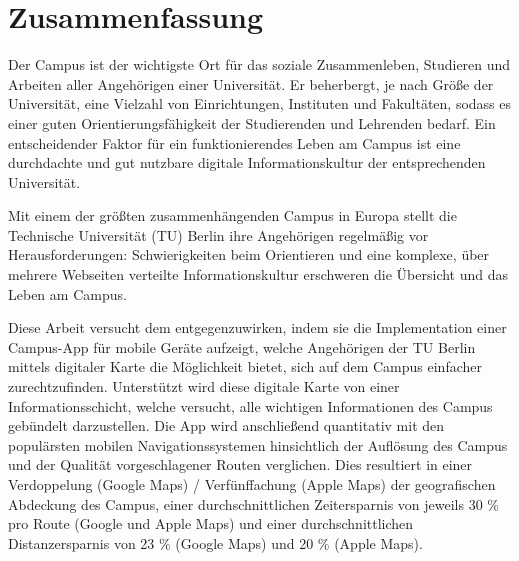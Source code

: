 \chapter*{Zusammenfassung}
\label{cha:zusammenfassung}

Der Campus ist der wichtigste Ort für das soziale Zusammenleben, Studieren und Arbeiten aller Angehörigen einer Universität. Er beherbergt, je nach Größe der Universität, eine Vielzahl von Einrichtungen, Instituten und Fakultäten, sodass es einer guten Orientierungsfähigkeit der Studierenden und Lehrenden bedarf. Ein entscheidender Faktor für ein funktionierendes Leben am Campus ist eine durchdachte und gut nutzbare digitale Informationskultur der entsprechenden Universität.

Mit einem der größten zusammenhängenden Campus in Europa stellt die Technische Universität (TU) Berlin ihre Angehörigen regelmäßig vor Herausforderungen: Schwierigkeiten beim Orientieren und eine komplexe, über mehrere Webseiten verteilte Informationskultur erschweren die Übersicht und das Leben am Campus.

Diese Arbeit versucht dem entgegenzuwirken, indem sie die Implementation einer Campus-App für mobile Geräte aufzeigt, welche Angehörigen der TU Berlin mittels digitaler Karte die Möglichkeit bietet, sich auf dem Campus einfacher zurechtzufinden. Unterstützt wird diese digitale Karte von einer Informationsschicht, welche versucht, alle wichtigen Informationen des Campus gebündelt darzustellen. Die App wird anschließend quantitativ mit den populärsten mobilen Navigationssystemen hinsichtlich der Auflösung des Campus und der Qualität vorgeschlagener Routen verglichen. Dies resultiert in einer Verdoppelung (Google Maps) / Verfünffachung (Apple Maps) der geografischen Abdeckung des Campus, einer durchschnittlichen Zeitersparnis von jeweils 30 \% pro Route (Google und Apple Maps) und einer durchschnittlichen Distanzersparnis von 23 \% (Google Maps) und 20 \% (Apple Maps).
